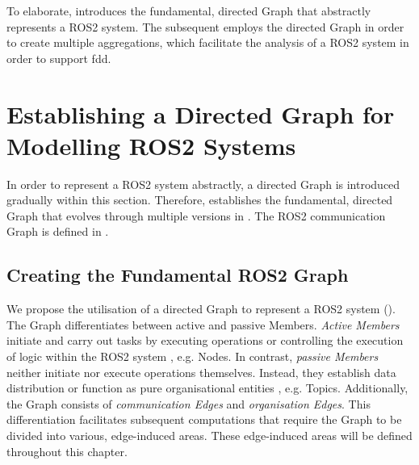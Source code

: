     To elaborate,  introduces the fundamental, directed Graph that abstractly represents a ROS2 system. The subsequent  employs the directed Graph in order to create multiple aggregations, which facilitate the analysis of a ROS2 system in order to support \acl{fdd}.

    \section{Establishing a Directed Graph for Modelling ROS2 Systems} \label{sec:mathModel:directedGraph}
    In order to represent a ROS2 system abstractly, a directed Graph is introduced gradually within this section. Therefore,  establishes the fundamental, directed Graph that evolves through multiple versions in . The ROS2 communication Graph is defined in .


    \subsection{Creating the Fundamental ROS2 Graph} \label{subsec:mathModel:causalROS2Graph}

    We propose the utilisation of a directed Graph to represent a ROS2 system (). The Graph differentiates between active and passive Members. \emph{Active Members} initiate and carry out tasks by executing operations or controlling the execution of logic within the ROS2 system \cite[p.~2]{adaPaper}, e.g. Nodes. In contrast, \emph{passive Members} neither initiate nor execute operations themselves. Instead, they establish data distribution or function as pure organisational entities \cite[p.~2]{adaPaper}, e.g. Topics.\newline
    Additionally, the Graph consists of \emph{communication Edges} and \emph{organisation Edges}. This differentiation facilitates subsequent computations that require the Graph to be divided into various, edge-induced areas. These edge-induced areas will be defined throughout this chapter.

